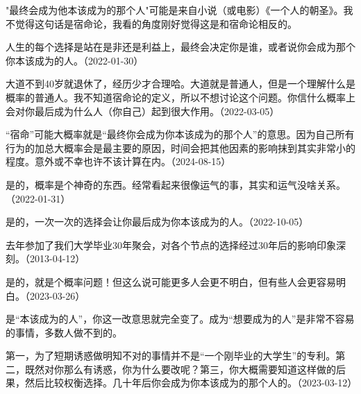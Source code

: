 
"最终会成为他本该成为的那个人"可能是来自小说（或电影）《一个人的朝圣》。我不觉得这句话是宿命论，我看的角度刚好觉得这是和宿命论相反的。

人生的每个选择是站在是非还是利益上，最终会决定你是谁，或者说你会成为那个你本该成为的人。（2022-01-30）

大道不到40岁就退休了，经历少才合理哈。大道就是普通人，但是一个理解什么是概率的普通人。我不知道宿命论的定义，所以不想讨论这个问题。你信什么概率上会对你最后成为什么人（你自己）起到很大作用。（2022-03-05）


“宿命”可能大概率就是“最终你会成为你本该成为的那个人”的意思。因为自己所有行为的加总大概率会是最主要的原因，时间会把其他因素的影响抹到其实非常小的程度。意外或不幸也许不该计算在内。（2024-08-15）


是的，概率是个神奇的东西。经常看起来很像运气的事，其实和运气没啥关系。（2022-01-31）


是的，一次一次的选择会让你最后成为你本该成为的人。（2022-10-05）

去年参加了我们大学毕业30年聚会，对各个节点的选择经过30年后的影响印象深刻。（2013-04-12）


是的，就是个概率问题！但这么说可能更多人会更不明白，但有些人会更容易明白。（2023-03-26）


是“本该成为的人”，你这一改意思就完全变了。成为“想要成为的人”是非常不容易的事情，多数人做不到的。


第一，为了短期诱惑做明知不对的事情并不是“一个刚毕业的大学生”的专利。第二，既然对你那么有诱惑，你为什么要改呢？第三，你大概需要知道这样做的后果，然后比较权衡选择。几十年后你会成为你本该成为的那个人的。（2023-03-12）


